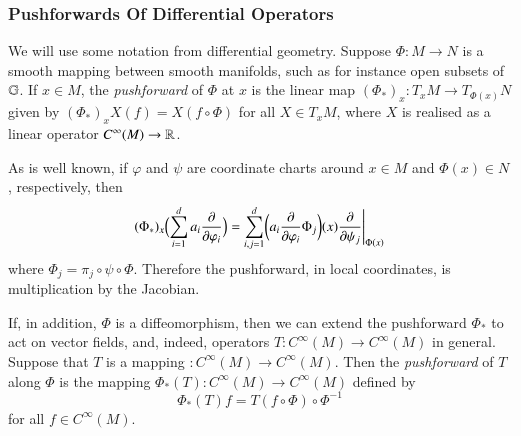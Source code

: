 \documentclass[leqno]{amsart}
\begin{document}
	\subsubsection{Pushforwards Of Differential Operators}\label{pushforwardsubsub}
	
	We will use some notation from differential geometry. Suppose $\Phi:M\to N$ is a smooth mapping between smooth manifolds, such as for instance open subsets of $\mathbb{G}$. If $x\in M$, the \textit{pushforward} of $\Phi$ at $x$ is the linear map $(\Phi_*)_x:T_xM\to T_{\Phi(x)}N$ given by $(\Phi_*)_xX(f)=X(f\circ\Phi)$ for all $X\in T_xM$, where $X$ is realised as a linear operator $C^\infty(M)\to \mathbb{R}$.
	
	As is well known, if $\varphi$ and $\psi$ are coordinate charts around $x\in M$ and $\Phi(x)\in N$, respectively, then
	\begin{equation}\label{pfptcoord}
		(\Phi_*)_x\Bigl(\sum_{i=1}^d a_i\frac{\partial}{\partial \varphi_i}\Bigr)=\sum_{i,j=1}^d \biggl(a_i \frac{\partial}{\partial\varphi_i}\Phi_j\biggr)(x)\frac{\partial}{\partial \psi_j}\Bigg|_{\Phi(x)}
	\end{equation}
	where $\Phi_j=\pi_j\circ\psi\circ\Phi$. Therefore the pushforward, in local coordinates, is multiplication by the Jacobian.
	
	If, in addition, $\Phi$ is a diffeomorphism, then we can extend the pushforward $\Phi_*$ to act on vector fields, and, indeed, operators $T:C^\infty(M)\to C^\infty(M)$ in general. Suppose that $T$ is a mapping $:C^\infty(M)\to C^\infty(M)$. Then the \textit{pushforward} of $T$ along $\Phi$ is the mapping $\Phi_*(T):C^\infty(M)\to C^\infty(M)$ defined by
	\begin{equation}\label{pushforward}
		\Phi_*(T)f=T(f\circ\Phi)\circ\Phi^{-1}
	\end{equation}
	for all $f\in C^\infty(M)$.
	
\end{document}

